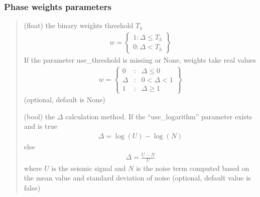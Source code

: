 \documentclass[letterpaper,10pt,english]{sphinxmanual}
\begin{document}
\subsubsection{Phase weights parameters}
\label{\detokenize{configuration:phase-weights-parameters}}\begin{quote}\begin{description}
\sphinxAtStartPar
(float) the binary weights threshold \(T_h\)
\begin{equation*}
\begin{split}w = \left\{ {\begin{matrix} 1:\Delta \le T_h \\
0:\Delta < T_h \end{matrix}} \right\}\end{split}
\end{equation*}
\sphinxAtStartPar
If the parameter use\_threshold is missing or None, weights take real values
\begin{equation*}
\begin{split}w = \left\{ \begin{matrix}
0 & : & \Delta \le 0 \\
\Delta & : & 0 < \Delta < 1\\
1 & : & \Delta \ge 1
\end{matrix} \right\}\end{split}
\end{equation*}
\sphinxAtStartPar
(optional, default is None)

\sphinxAtStartPar
(bool) the \(\Delta\) calculation method.
If the “use\_logarithm” parameter exists and is true
\begin{equation*}
\begin{split}\Delta = \log\left(U \right) - \log\left( N \right)\end{split}
\end{equation*}
\sphinxAtStartPar
else
\begin{equation*}
\begin{split}\Delta = \frac{U-N}{U}\end{split}
\end{equation*}
\sphinxAtStartPar
where \(U\) is the seismic signal and \(N\) is the noise term
computed based on the mean value and standard deviation of noise
(optional, default value is false)


\end{description}
\end{quote}
\end{document}
